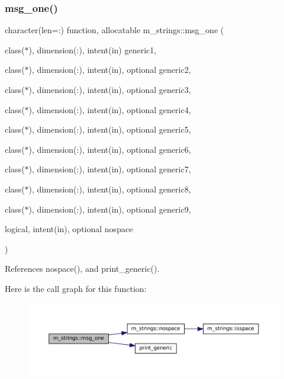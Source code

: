 \subsubsection{\texorpdfstring{msg\+\_\+one()}{msg\_one()}}
{\footnotesize\ttfamily character(len=\+:) function, allocatable m\+\_\+strings\+::msg\+\_\+one (\begin{DoxyParamCaption}\item[{class($\ast$), dimension(\+:), intent(in)}]{generic1,  }\item[{class($\ast$), dimension(\+:), intent(in), optional}]{generic2,  }\item[{class($\ast$), dimension(\+:), intent(in), optional}]{generic3,  }\item[{class($\ast$), dimension(\+:), intent(in), optional}]{generic4,  }\item[{class($\ast$), dimension(\+:), intent(in), optional}]{generic5,  }\item[{class($\ast$), dimension(\+:), intent(in), optional}]{generic6,  }\item[{class($\ast$), dimension(\+:), intent(in), optional}]{generic7,  }\item[{class($\ast$), dimension(\+:), intent(in), optional}]{generic8,  }\item[{class($\ast$), dimension(\+:), intent(in), optional}]{generic9,  }\item[{logical, intent(in), optional}]{nospace }\end{DoxyParamCaption})\hspace{0.3cm}{\ttfamily [private]}}



References nospace(), and print\+\_\+generic().

Here is the call graph for this function\+:\nopagebreak
\begin{figure}[H]
\begin{center}
\leavevmode
\includegraphics[width=350pt]{namespacem__strings_a52d27df9dcea52039c6feccb782ec4fd_cgraph}
\end{center}
\end{figure}
\mbox{\label{namespacem__strings_a926d1d9f529487149f4e0a1de8294122}} 
